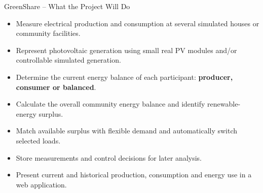 \begin{frame}{GreenShare -- What the Project Will Do}
\small
\begin{itemize}
    \item Measure electrical production and consumption at several simulated houses or community facilities.
    \item Represent photovoltaic generation using small real PV modules and/or controllable simulated generation.
    \item Determine the current energy balance of each participant: \textbf{producer, consumer or balanced}.
    \item Calculate the overall community energy balance and identify renewable-energy surplus.
    \item Match available surplus with flexible demand and automatically switch selected loads.
    \item Store measurements and control decisions for later analysis.
    \item Present current and historical production, consumption and energy use in a web application.
\end{itemize}
\end{frame}
